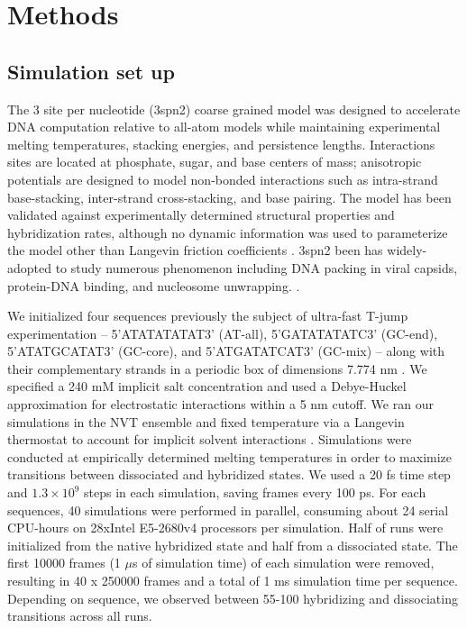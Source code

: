 \documentclass[journal=jpcbfk,manuscript=article]{achemso}
\begin{document}
\section{\label{sec:methods}Methods}

\subsection{\label{sec:methods}Simulation set up}

The 3 site per nucleotide (3spn2) coarse grained model was designed to accelerate DNA computation relative to all-atom models while maintaining experimental melting temperatures, stacking energies, and persistence lengths\citep{Hinckley2013AnHybridization}. Interactions sites are located at phosphate, sugar, and base centers of mass; anisotropic potentials are designed to model non-bonded interactions such as intra-strand base-stacking, inter-strand cross-stacking, and base pairing. The model has been validated against experimentally determined structural properties and hybridization rates, although no dynamic information was used to parameterize the model other than Langevin friction coefficients \citep{Hinckley2013AnHybridization, Hinckley2014Coarse-grainedEffects}. 3spn2 been has widely-adopted to study numerous phenomenon including DNA packing in viral capsids, protein-DNA binding, and nucleosome unwrapping. \citep{Cordoba2017AIons, Lu2020OpenAWSEMSummary, Lequieu2016Tension-dependentUnwrapping}. 

We initialized four sequences previously the subject of ultra-fast T-jump experimentation -- 5'ATATATATAT3' (AT-all), 5'GATATATATC3' (GC-end), 5'ATATGCATAT3' (GC-core), and 5'ATGATATCAT3' (GC-mix) -- along with their complementary strands in a periodic box of dimensions 7.774 nm \citep{Sanstead2016, Phys2014}. We specified a 240 mM implicit salt concentration and used a Debye-Huckel approximation for electrostatic interactions within a 5 nm cutoff. We ran our simulations in the NVT ensemble and fixed temperature via a Langevin thermostat to account for implicit solvent interactions \citep{Schneider1978Molecular-dynamicsTransitions}. Simulations were conducted at empirically determined  melting temperatures in order to maximize transitions between dissociated and hybridized states. We used a 20 fs time step and $1.3\times10^{9}$ steps in each simulation, saving frames every 100 ps. For each sequences, 40 simulations were performed in parallel, consuming about 24 serial CPU-hours on 28xIntel E5-2680v4 processors per simulation. Half of runs were initialized from the native hybridized state and half from a dissociated state. The first 10000 frames (1 $\mu$s of simulation time) of each simulation were removed, resulting in 40 x 250000 frames and a total of 1 ms simulation time per sequence. Depending on sequence, we observed between 55-100 hybridizing and dissociating transitions across all runs.
\end{document}
